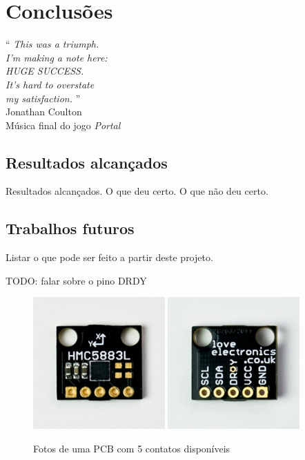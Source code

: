 \documentclass[brazil,pagestart=firstchapter]{abnt}
\begin{document}
\chapter{Conclusões}
\label{cap:conclusoes}


\vfill{}
\begin{flushright}{}
``\emph{
	This was a triumph.    \\
	I'm making a note here:\\
	HUGE SUCCESS.          \\
	It's hard to overstate \\
	my satisfaction.
}''\\
{\small Jonathan Coulton} \\
{\small Música final do jogo \textit{Portal}}
\end{flushright}{\small \par}
\vfill{}

\newpage


\section{Resultados alcançados}
\label{sec:resultados}

Resultados alcançados. O que deu certo. O que não deu certo.

\section{Trabalhos futuros}
\label{sec:trabalhos_futuros}

Listar o que pode ser feito a partir deste projeto.


TODO: falar sobre o pino DRDY

\begin{figure}[h]
\centering
\includegraphics[width=0.45\textwidth]{img/sensor_other_pcb_top.jpg}
\includegraphics[width=0.45\textwidth]{img/sensor_other_pcb_bottom.jpg}
\caption{Fotos de uma PCB com 5 contatos disponíveis}
\label{fig:loveelectronics_photos}
\end{figure}
\end{document}
